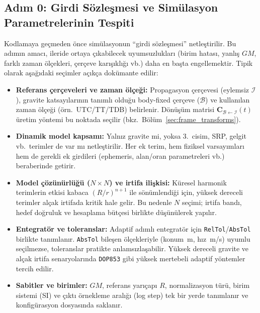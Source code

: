\subsection{Adım 0: Girdi Sözleşmesi ve Simülasyon Parametrelerinin Tespiti}
Kodlamaya geçmeden önce simülasyonun ``girdi sözleşmesi'' netleştirilir. Bu adımın amacı, ileride ortaya çıkabilecek
uyumsuzlukları (birim hatası, yanlış $GM$, farklı zaman ölçekleri, çerçeve karışıklığı vb.) daha en başta engellemektir.
Tipik olarak aşağıdaki seçimler açıkça dokümante edilir:
\begin{itemize}
    \item \textbf{Referans çerçeveleri ve zaman ölçeği:} Propagasyon çerçevesi (eylemsiz $\mathcal I$), gravite katsayılarının
    tanımlı olduğu body-fixed çerçeve ($\mathcal B$) ve kullanılan zaman ölçeği (örn.\ UTC/TT/TDB) belirlenir.
    Dönüşüm matrisi $\mathbf C_{\mathcal B\leftarrow\mathcal I}(t)$ üretim yöntemi bu noktada seçilir
    (bkz.\ Bölüm~\ref{sec:frame_transforms}).

    \item \textbf{Dinamik model kapsamı:} Yalnız gravite mi, yoksa 3.\ cisim, SRP, gelgit vb.\ terimler de var mı netleştirilir.
    Her ek terim, hem fiziksel varsayımları hem de gerekli ek girdileri (ephemeris, alan/oran parametreleri vb.) beraberinde getirir.

    \item \textbf{Model çözünürlüğü ($N\times N$) ve irtifa ilişkisi:} Küresel harmonik terimlerin etkisi kabaca
    $(R/r)^{n+1}$ ile sönümlendiği için, yüksek dereceli terimler alçak irtifada kritik hale gelir.
    Bu nedenle $N$ seçimi; irtifa bandı, hedef doğruluk ve hesaplama bütçesi birlikte düşünülerek yapılır.

    \item \textbf{Entegratör ve toleranslar:} Adaptif adımlı entegratör için \texttt{RelTol}/\texttt{AbsTol} birlikte tanımlanır.
    \texttt{AbsTol} bileşen ölçekleriyle (konum~m, hız~m/s) uyumlu seçilmezse, toleranslar pratikte anlamsızlaşabilir.
    Yüksek dereceli gravite ve alçak irtifa senaryolarında \texttt{DOP853} gibi yüksek mertebeli adaptif yöntemler tercih edilir.

    \item \textbf{Sabitler ve birimler:} $GM$, referans yarıçapı $R$, normalizasyon türü, birim sistemi (SI) ve
    çıktı örnekleme aralığı (log step) tek bir yerde tanımlanır ve konfigürasyon dosyasında saklanır.
\end{itemize}

